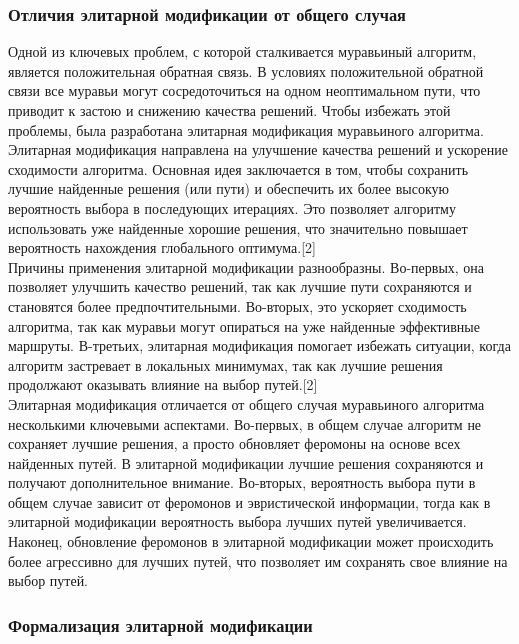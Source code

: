 \documentclass[14pt]{article}
\begin{document}
\subsubsection{Отличия элитарной модификации от общего случая}

Одной из ключевых проблем, с которой сталкивается муравьиный алгоритм, является положительная обратная связь. В условиях положительной обратной связи все муравьи могут сосредоточиться на одном неоптимальном пути, что приводит к застою и снижению качества решений. Чтобы избежать этой проблемы, была разработана элитарная модификация муравьиного алгоритма.\\

Элитарная модификация направлена на улучшение качества решений и ускорение сходимости алгоритма. Основная идея заключается в том, чтобы сохранить лучшие найденные решения (или пути) и обеспечить их более высокую вероятность выбора в последующих итерациях. Это позволяет алгоритму использовать уже найденные хорошие решения, что значительно повышает вероятность нахождения глобального оптимума.[2]\\

Причины применения элитарной модификации разнообразны. Во-первых, она позволяет улучшить качество решений, так как лучшие пути сохраняются и становятся более предпочтительными. Во-вторых, это ускоряет сходимость алгоритма, так как муравьи могут опираться на уже найденные эффективные маршруты. В-третьих, элитарная модификация помогает избежать ситуации, когда алгоритм застревает в локальных минимумах, так как лучшие решения продолжают оказывать влияние на выбор путей.[2]\\

Элитарная модификация отличается от общего случая муравьиного алгоритма несколькими ключевыми аспектами. Во-первых, в общем случае алгоритм не сохраняет лучшие решения, а просто обновляет феромоны на основе всех найденных путей. В элитарной модификации лучшие решения сохраняются и получают дополнительное внимание. Во-вторых, вероятность выбора пути в общем случае зависит от феромонов и эвристической информации, тогда как в элитарной модификации вероятность выбора лучших путей увеличивается. Наконец, обновление феромонов в элитарной модификации может происходить более агрессивно для лучших путей, что позволяет им сохранять свое влияние на выбор путей.

\subsubsection{Формализация элитарной модификации}
\end{document}

